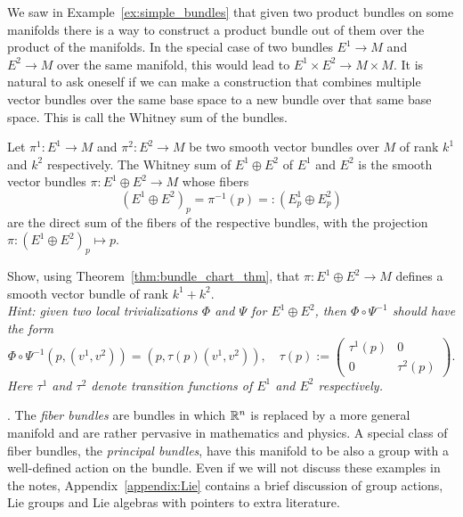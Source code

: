 We saw in Example~\ref{ex:simple_bundles} that given two product bundles on some manifolds there is a way to construct a product bundle out of them over the product of the manifolds.
In the special case of two bundles $E^1 \to M$ and $E^2 \to M$ over the same manifold, this would lead to $E^1 \times E^2 \to M \times M$.
It is natural to ask oneself if we can make a construction that combines multiple vector bundles over the same base space to a new bundle over that same base space.
This is call the Whitney sum of the bundles.
\begin{exercise}\label{ex:whitney}
  Let $\pi^1 : E^1 \to M$ and $\pi^2 : E^2 \to M$ be two smooth vector bundles over $M$ of rank $k^1$ and $k^2$ respectively.
  The Whitney sum of $E^1 \oplus E^2$ of $E^1$ and $E^2$ is the smooth vector bundles $\pi: E^1 \oplus E^2 \to M$ whose fibers
  \begin{equation}
    (E^1 \oplus E^2)_p = \pi^{-1}(p) =: (E^1_p \oplus E^2_p)
  \end{equation}
  are the direct sum of the fibers of the respective bundles, with the projection $\pi: (E^1\oplus E^2)_p \mapsto p$.

  Show, using Theorem~\ref{thm:bundle_chart_thm}, that $\pi: E^1 \oplus E^2 \to M$ defines a smooth vector bundle of rank $k^1 + k^2$.\\
  \textit{\small
    Hint: given two local trivializations $\varPhi$ and $\varPsi$ for $E^1\oplus E^2$, then $\varPhi\circ\varPsi^{-1}$ should have the form
    \begin{equation}
      \varPhi\circ\varPsi^{-1}(p, (v^1, v^2)) = (p, \tau(p)(v^1, v^2)), \quad
      \tau(p) :=
      \begin{pmatrix}
        \tau^1(p) & 0 \\
        0 & \tau^2(p)
      \end{pmatrix}.
    \end{equation}
    Here $\tau^1$ and $\tau^2$ denote transition functions of $E^1$ and $E^2$ respectively.
  }
\end{exercise}

.
The \emph{fiber bundles} are bundles in which $\mathbb{R}^n$ is replaced by a more general manifold and are rather pervasive in mathematics and physics.
A special class of fiber bundles, the \emph{principal bundles}, have this manifold to be also a group with a well-defined action on the bundle.
Even if we will not discuss these examples in the notes, Appendix~\ref{appendix:Lie} contains a brief discussion of group actions, Lie groups and Lie algebras with pointers to extra literature.

